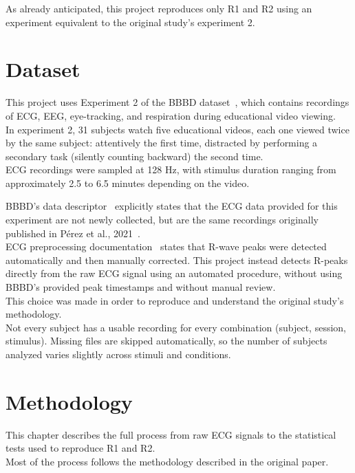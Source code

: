 \documentclass[pdflatex,sn-mathphys-num]{sn-jnl}%
\theoremstyle{thmstyleone}%
\theoremstyle{thmstyletwo}%
\theoremstyle{thmstylethree}%
\begin{document}
As already anticipated, this project reproduces only R1 and R2 using an experiment equivalent to the original study's experiment 2.\\

\section{Dataset}\label{sec3}

This project uses Experiment 2 of the BBBD dataset~\cite{bbbd}, which contains recordings of ECG, EEG, eye-tracking, and respiration during educational video viewing.\\
In experiment 2, 31 subjects watch five educational videos, each one viewed twice by the same subject: attentively the first time, distracted by performing a secondary task (silently counting backward) the second time. \\
ECG recordings were sampled at 128 Hz, with stimulus duration ranging from approximately 2.5 to 6.5 minutes depending on the video.

BBBD's data descriptor~\cite{bbbd} explicitly states that the ECG data provided for this experiment are not newly collected, but are the same recordings originally published in Pérez et al., 2021~\cite{perez2021}.\\
ECG preprocessing documentation~\cite{bbbd} states that R-wave peaks were detected automatically and then manually corrected.
This project instead detects R-peaks directly from the raw ECG signal using an automated procedure, without using BBBD's provided peak timestamps and without manual review.\\
This choice was made in order to reproduce and understand the original study's methodology.\\
Not every subject has a usable recording for every combination (subject, session, stimulus). Missing files are skipped automatically, so the number of subjects analyzed varies slightly across stimuli and conditions.


\section{Methodology}\label{sec4}

This chapter describes the full process from raw ECG signals to the statistical tests used to reproduce R1 and R2.\\
Most of the process follows the methodology described in the original paper.
\end{document}
